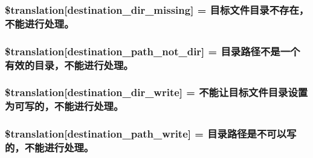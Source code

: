 \subsubsection[{\$translation}]{\setlength{\rightskip}{0pt plus 5cm}\$translation\mbox{[}\textquotesingle{}destination\+\_\+dir\+\_\+missing\textquotesingle{}\mbox{]} = \textquotesingle{}目标文件目录不存在，不能进行处理。\textquotesingle{}}\label{class_8upload_8zh___c_n_8php_a9ef28d3cf09942c6c0a1e77fa09185e8}
\hypertarget{class_8upload_8zh___c_n_8php_a5704a67137126e8c87b7a364175929d4}{}
\subsubsection[{\$translation}]{\setlength{\rightskip}{0pt plus 5cm}\$translation\mbox{[}\textquotesingle{}destination\+\_\+path\+\_\+not\+\_\+dir\textquotesingle{}\mbox{]} = \textquotesingle{}目录路径不是一个有效的目录，不能进行处理。\textquotesingle{}}\label{class_8upload_8zh___c_n_8php_a5704a67137126e8c87b7a364175929d4}
\hypertarget{class_8upload_8zh___c_n_8php_a97608ea194a616db49141a0e6dee900c}{}
\subsubsection[{\$translation}]{\setlength{\rightskip}{0pt plus 5cm}\$translation\mbox{[}\textquotesingle{}destination\+\_\+dir\+\_\+write\textquotesingle{}\mbox{]} = \textquotesingle{}不能让目标文件目录设置为可写的，不能进行处理。\textquotesingle{}}\label{class_8upload_8zh___c_n_8php_a97608ea194a616db49141a0e6dee900c}
\hypertarget{class_8upload_8zh___c_n_8php_a40e4e1962226b89fd76da5819a9602b0}{}
\subsubsection[{\$translation}]{\setlength{\rightskip}{0pt plus 5cm}\$translation\mbox{[}\textquotesingle{}destination\+\_\+path\+\_\+write\textquotesingle{}\mbox{]} = \textquotesingle{}目录路径是不可以写的，不能进行处理。\textquotesingle{}}\label{class_8upload_8zh___c_n_8php_a40e4e1962226b89fd76da5819a9602b0}
\hypertarget{class_8upload_8zh___c_n_8php_a2baece8da11e20d45175db91851ec3e3}{}
